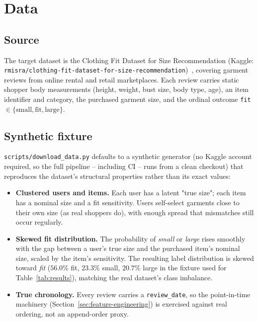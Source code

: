 \section{Data}
\label{sec:data}

\subsection{Source}

The target dataset is the Clothing Fit Dataset for Size Recommendation
(Kaggle: \texttt{rmisra/clothing-fit-dataset-for-size-recommendation})~\cite{misra2018decomposing},
covering garment reviews from online rental and retail marketplaces. Each
review carries static shopper body measurements (height, weight, bust size,
body type, age), an item identifier and category, the purchased garment
size, and the ordinal outcome \texttt{fit} $\in \{\text{small}, \text{fit},
\text{large}\}$.

\subsection{Synthetic fixture}

\texttt{scripts/download\_data.py} defaults to a synthetic generator (no
Kaggle account required, so the full pipeline -- including CI -- runs from a
clean checkout) that reproduces the dataset's structural properties rather
than its exact values:

\begin{itemize}
  \item \textbf{Clustered users and items.} Each user has a latent "true
        size"; each item has a nominal size and a fit sensitivity. Users
        self-select garments close to their own size (as real shoppers do),
        with enough spread that mismatches still occur regularly.
  \item \textbf{Skewed fit distribution.} The probability of \emph{small}
        or \emph{large} rises smoothly with the gap between a user's true
        size and the purchased item's nominal size, scaled by the item's
        sensitivity. The resulting label distribution is skewed toward
        \emph{fit} ($56.0\%$ fit, $23.3\%$ small, $20.7\%$ large in the
        fixture used for Table~\ref{tab:results}), matching the real
        dataset's class imbalance.
  \item \textbf{True chronology.} Every review carries a \texttt{review\_date},
        so the point-in-time machinery (Section~\ref{sec:feature-engineering})
        is exercised against real ordering, not an append-order proxy.
\end{itemize}

